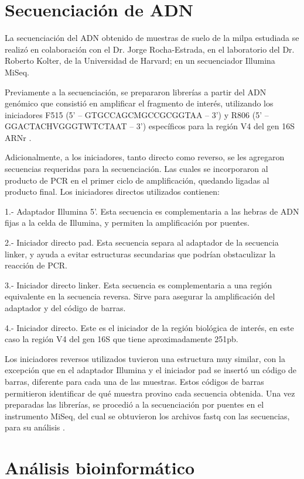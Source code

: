 \documentclass[12pt,letterpaper,oneside]{report}
\begin{document}
\section{Secuenciación de ADN}
La secuenciación del ADN obtenido de muestras de suelo de la milpa estudiada se realizó en colaboración con el Dr. Jorge Rocha-Estrada, en el laboratorio del Dr. Roberto Kolter, de la Universidad de Harvard; en un secuenciador Illumina MiSeq.
\par
Previamente a la secuenciación, se prepararon librerías a partir del ADN genómico que consistió en amplificar el fragmento de interés, utilizando los iniciadores F515 (5’ – GTGCCAGCMGCCGCGGTAA – 3’) y R806 (5’ – GGACTACHVGGGTWTCTAAT – 3’) específicos para la región V4 del gen 16S ARNr \autocite{Caporaso2010b}.
\par
Adicionalmente, a los iniciadores, tanto directo como reverso, se les agregaron secuencias requeridas para la secuenciación. Las cuales se incorporaron al producto de PCR en el primer ciclo de amplificación, quedando ligadas al producto final. Los iniciadores directos utilizados contienen:
\par
1.- Adaptador Illumina 5'. Esta secuencia es complementaria a las hebras de ADN fijas a la celda de Illumina, y permiten la amplificación por puentes.
\par
2.- Iniciador directo pad. Esta secuencia separa al adaptador de la secuencia linker, y ayuda a evitar estructuras secundarias que podrían obstaculizar la reacción de PCR.
\par
3.- Iniciador directo linker. Esta secuencia es complementaria a una región equivalente en la secuencia reversa. Sirve para asegurar la amplificación del adaptador y del código de barras. 
\par
4.- Iniciador directo. Este es el iniciador de la región biológica de interés, en este caso la región V4 del gen 16S que tiene aproximadamente 251pb.
\par
Los iniciadores reversos utilizados tuvieron una estructura muy similar, con la excepción que en el adaptador Illumina y el iniciador pad se insertó un código de barras, diferente para cada una de las muestras. Estos códigos de barras permitieron identificar de qué muestra provino cada secuencia obtenida. Una vez preparadas las librerías, se procedió a la secuenciación por puentes en el instrumento MiSeq, del cual se obtuvieron los archivos fastq con las secuencias, para su análisis \autocite{Fadrosh2014}.

\section{Análisis bioinformático}
\end{document}
